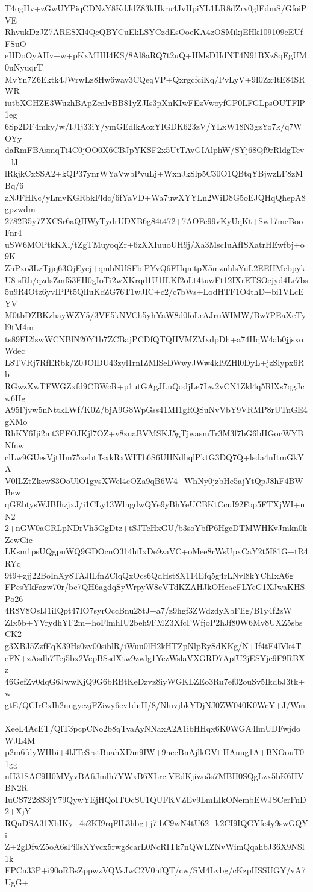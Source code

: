 T4ogHv+zGwUYPiqCDNzY8KdJdZ83kHkru4JvHpiYL1LR8dZrv0glEdmS/GfoiPVE
RhvukDzJZ7ARESXl4QcQBYCuEkLSYCzdEsOoeKA4zOSMikjEHk109109eEUfFSuO
eHDoOyAHv+w+pKxMHH4KS/8Al8aRQ7t2uQ+HMsDHdNT4N91BXz8qEgUM0uNyuqrT
MvYn7Z6Ektk4JWrwLz8Hw6way3CQeqVP+QxrgcfciKq/PvLyV+9I0Zx4tE84SRWR
iutbXGHZE3WuzhBApZealvBB81yZJIs3pXnKIwFEzVwoyfGP0LFGLpsOUTFlP1eg
6Sp2DF4mky/w/IJ1j33iY/ymGEdlkAoxYIGDK623zV/YLxW18N3gzYo7k/q7WOYy
daRmFBAsmqTi4C0jOO0X6CBJpYKSF2x5UtTAvGIAlphW/SYj68Qf9rRldgTev+lJ
lRkjkCxSSA2+kQP37ynrWYaVwbPvuLj+WxnJkSlp5C30O1QBtqYBjwzLF8zMBq/6
zNJFHKc/yLmvKGRbkFldc/6fYaVD+Wa7uwXYYLn2WiD8G5oEJQHqQhepA8gpzwdm
2782B5y7ZXCSr6aQHWyTydrUDXB6g84t472+7AOFc99vKyUqKt+Sw17meBooFnr4
uSW6MOPtkKXl/tZgTMuyoqZr+6zXXIuuoUH9j/Xa3MscIuAfISXatrHEwfbj+o9K
ZhPxo3LzTjjq63OjEyej+qmbNUSFbiPYvQ6FHqmtpX5mznhlsYuL2EEHMebpykU8
sRh/qzdsZmf53FH0gIoTi2wXKrqd1U1ILKf2oLt4tuwFt12IXrETSOejyd4Lr7bs
5u9R4Otz6yvIPPt5QlIuKcZG76T1wJIC+c2/c7bWs+LodHTF1O4thD+bi1VLcEYV
M0tbDZBKzhayWZY5/3VE5kNVCh5yhYaW8d0foLrAJruWIMW/Bw7PEaXeTyl9tM4m
ts89FI2lswWCNBlN20Y1b7ZCBajPCDfQTQHVMZMxdpDh+a74HqW4ab0jjsxoWdec
L8TVRj7RfERbk/Z0JOlDU43zyl1rnIZMlSeDWwyJWw4kI9ZHl0DyL+jzSlypx6Rb
RGwzXwTFWGZxfd9CBWcR+p1utGAgJLuQodjLe7Lw2vCN1Zkl4q5RlXs7qgJcw6Hg
A95Fjvw5nNttkLWf/K0Z/bjA9G8WpGss41MI1gRQSuNvVbY9VRMP8rUTnGE4gXMo
RhKY6Iji2mt3PFOJKjl7OZ+v8zuaBVMSKJ5gTjwasmTr3M3f7bG6bHGocWYBNfnw
clLw9GUesVjtHm75xebtffsxkRxWITb6S6UHNdhqlPktG3DQ7Q+lsda4nItmGkYA
V0lLZtZkcwS3OoUlO1gysXWel4cOZa9qB6W4+WhNy0jzbHe5ajYtQpJ8hF4BWBew
qGEbtysWJBIhzjxJ/i1CLy13WlngdwQYe9yBhYeUCBKtCcuI92Fop5FTXjWI+nN2
2+nGW0aGRLpNDrVh5GgDtz+tSJTeHxGU/b3soYbfP6HgcDTMWHKvJmkn0kZcwGic
LKsm1psUQgpuWQ9GDOcnO314hfIxDe9zaVC+oMee8rWsUpxCaY2t5I81G+tR4RYq
9t9+zjj22BoInXy8TAJlLfnZClqQxOcs6QdHst8X114Efq5g4rLNvl8kYChIxA6g
FPcsYkFazw70r/bc7QH6agdqSyWrpyW8cVTdKZAHJkOHcacFLYcG1XJwaKHSPo26
4R8V8OsIJ1iIQpt47IO7syrOccBnu28tJ+a7/z9hgf3ZWdzdyXbFIig/B1y4f2zW
ZIx5b+YVrydhYF2m+hoFlmhIU2beh9FMZ3XfcFWfjoP2hJf80W6Mv8UXZ5sbsCK2
g3XBJ5ZzfFqK39Hs0zv00siblR/iWuu0lH2kHTZpNlpRySdKKg/N+If4tF4lVk4T
eFN+zAsdh7Tej5bx2VepBSsdXtw9zwlg1YezWslaVXGRD7ApfU2jESYje9F9RBXz
46GefZv0dqG6JwwKjQ9G6bRBtKeDzvz8iyWGKLZEo3Ru7ef02ouSv5IkdbJ3tk+w
gtE/QCIrCxIh2nngyezjFZiwy6ev1dnH/8/NluvjbkYDjNJ0ZW040K0WcY+J/Wm+
XeeL4AcET/QlT3pcpCNo2b8qTvaAyNNaxA2A1ibHHqx6K0WGA4lmUDFwjdoWJL4M
p2m6fdyWHbi+4lJTcSrstBuahXDm9IW+9nceBnAjlkGVtiHAuug1A+BNOouT01gg
nH31SAC9H0MVyvBAfiJmlh7YWxB6XLrciVEdKjiwo3s7MBH0SQgLzx5bK6HVBN2R
IuCS7228S3jY79QywYEjHQoITOcSU1QUFKVZEv9LmLIkONembEWJSCerFnD2+XjY
RQuDSA31XbIKy+4s2KI9rqFlL3hbg+j7ibC9wN4tU62+k2CI9IQGYfe4y9swGQYi
Z+2gDfwZ5oA6sPi0sXYvcx5rwg8carL0NcRITk7nQWLZNvWimQqahbJ36X9NSl1k
FPCn33P+i90oRBsZppwzVQVsJwC2V0nfQT/cw/SM4Lvbg/cKzpHSSUGY/vA7UgG+
